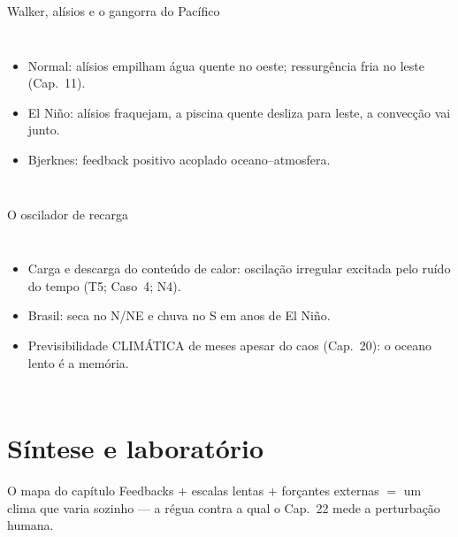\documentclass[aspectratio=169,11pt]{beamer}
\begin{document}
\begin{frame}{Walker, alísios e o gangorra do Pacífico}
  \begin{columns}
    \begin{itemize}
      \item Normal: alísios empilham água quente no oeste;
            ressurgência fria no leste (Cap.~11).
      \item El Niño: alísios fraquejam, a piscina quente desliza para
            leste, a convecção vai junto.
      \item Bjerknes: feedback positivo acoplado oceano--atmosfera.
    \end{itemize}
  \end{columns}
\end{frame}

\begin{frame}{O oscilador de recarga}
  \begin{columns}
    \vspace{0.4em}
    \begin{itemize}
      \item Carga e descarga do conteúdo de calor: oscilação
            irregular excitada pelo ruído do tempo (T5; Caso~4; N4).
      \item Brasil: seca no N/NE e chuva no S em anos de El Niño.
      \item Previsibilidade CLIMÁTICA de meses apesar do caos
            (Cap.~20): o oceano lento é a memória.
    \end{itemize}
  \end{columns}
\end{frame}

\section{Síntese e laboratório}

\begin{frame}{O mapa do capítulo}
  \vspace{0.6em}
  Feedbacks $+$ escalas lentas $+$ forçantes externas $=$ um clima que
  varia sozinho — a régua contra a qual o Cap.~22 mede a perturbação
  humana.
\end{frame}
\end{document}

